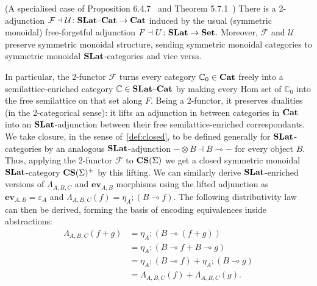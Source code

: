 \begin{prop}(A specialised case of Proposition 6.4.7~\cite{Borceux_1994} and Theorem 5.7.1~\cite{cruttwell2008normed})
	There is a 2-adjunction
	\(
	\mathcal{F} \dashv \mathcal{U}\colon \mathbf{SLat}\text{--}\mathbf{Cat} \to \mathbf{Cat}
	\)
	induced by the usual (symmetric monoidal) free-forgetful adjunction
	\(
	F \dashv U\colon \mathbf{SLat} \to \mathbf{Set}.
	\)
	Moreover, $\mathcal{F}$ and $\mathcal{U}$ preserve symmetric monoidal structure, sending symmetric monoidal categories to symmetric monoidal $\mathbf{SLat}$-categories and vice versa.
\end{prop}
In particular, the 2-functor $\mathcal{F}$ turns every category $\mathbb{C}_0 \in \mathbf{Cat}$ freely into a semilattice-enriched category $\mathbb{C} \in \mathbf{SLat}\text{--}\mathbf{Cat}$ by making every Hom set of $\mathbb{C}_0$ into the free semilattice on that set along $F$.
Being a 2-functor, it preserves dualities (in the 2-categorical sense): it lifts an adjunction in between categories in $\mathbf{Cat}$ into an $\mathbf{SLat}$-adjunction between their free semilattice-enriched correspondants.
We take closure, in the sense of~\autoref{def:closed}, to be defined generally for $\mathbf{SLat}$-categories by an analogous $\mathbf{SLat}$-adjunction $- \otimes B \dashv B \multimap -$ for every object $B$.
Thus, applying the 2-functor $\mathcal{F}$ to $\mathbf{CS}(\Sigma)$ we get a closed symmetric monoidal $\mathbf{SLat}$-category $\mathbf{CS}(\Sigma)^{+}$ by this lifting.
We can similarly derive $\mathbf{SLat}$-enriched versions of  $\Lambda_{A,B,C}$ and $\textbf{ev}_{A,B}$ morphisms using the lifted adjunction as $\textbf{ev}_{A,B} = \varepsilon_{A}$ and $\Lambda_{A,B,C}(f) = \eta_A; (B \multimap{} f)$.
The following distributivity law can then be derived, forming the basis of encoding equivalences inside abstractions:
\begin{equation}
	\begin{aligned}
		\Lambda_{A,B,C}(f + g) & = \eta_A;(B \multimap (f + g))                    \\
		                       & = \eta_A;(B \multimap f + B \multimap g)          \\
		                       & = \eta_A;(B \multimap f) + \eta_A;(B \multimap g) \\
		                       & = \Lambda_{A,B,C}(f) + \Lambda_{A,B,C}(g).
	\end{aligned}%
	\label{law:distributivity}
\end{equation}

